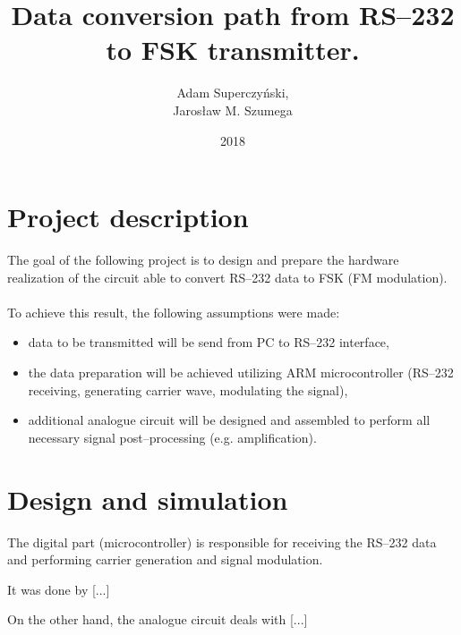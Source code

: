 \documentclass[eng,printmode, openany]{mgr}
\author{Adam Superczyński,\\Jarosław M. Szumega}
\title{Data conversion path from RS--232 to FSK transmitter. }
\date{2018}
\begin{document}
	\maketitle
	\tableofcontents
\chapter{Project description}
The goal of the following project is to design and prepare the hardware realization of the circuit able to convert RS--232 data to FSK (FM modulation).\\
\\
To achieve this result, the following assumptions were made:
\begin{itemize}
	\item data to be transmitted will be send from PC to RS--232 interface,
	\item the data preparation will be achieved utilizing ARM microcontroller (RS--232 receiving, generating carrier wave, modulating the signal),
	\item additional analogue circuit will be designed and assembled to perform all necessary signal post--processing (e.g. amplification).
\end{itemize}
\chapter{Design and simulation}

The digital part (microcontroller) is responsible for receiving the RS--232 data and performing carrier generation and signal modulation.

It was done by [...]

On the other hand, the analogue circuit deals with [...]
\end{document}
